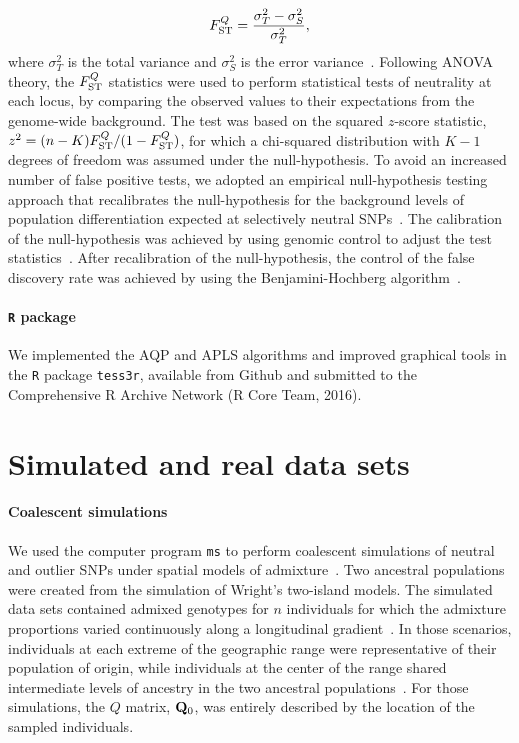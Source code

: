 $$
F^Q _{\rm ST}  =  \frac{\sigma^2_T - \sigma^2_S}{\sigma^2_T },
$$
where $\sigma^2_T$ is the total variance and $\sigma^2_S$ is the error
variance~\citep{weir1996}. Following ANOVA theory, the $F^Q_{\rm ST}$ statistics
were used to perform statistical tests of neutrality at each locus, by comparing
the observed values to their expectations from the genome-wide background. The
test was based on the squared $z$-score statistic, $z^2 = (n-K) F^{Q}_{\rm
  ST}/(1 - F^{Q}_{\rm ST})$, for which a chi-squared distribution with $K-1$
degrees of freedom was assumed under the null-hypothesis. To avoid an increased
number of false positive tests, we adopted an empirical null-hypothesis testing
approach that recalibrates the null-hypothesis for the background levels of
population differentiation expected at selectively neutral SNPs~\citep{efron2004}.
The calibration of the null-hypothesis was achieved by using genomic control to
adjust the test statistics~\citep{Devlin1999, Francois2016}. After recalibration
of the null-hypothesis, the control of the false discovery rate was achieved by
using the Benjamini-Hochberg algorithm~\citep{Benjamini1995}.


\paragraph{{\tt R} package} We implemented the AQP and APLS algorithms and
improved graphical tools in the {\tt R} package {\tt tess3r}, available from
Github and submitted to the Comprehensive R Archive Network (R Core Team, 2016).


\section{Simulated and real data sets}
\paragraph{Coalescent simulations} We used the computer program {\tt ms} to
perform coalescent simulations of neutral and outlier SNPs under spatial models
of admixture~\citep{Hudson2002}. Two ancestral populations were created from the
simulation of Wright\rq{}s two-island models. The simulated data sets contained
admixed genotypes for $n$ individuals for which the admixture proportions varied
continuously along a longitudinal gradient~\citep{Durand2009, Francois2010}. In
those scenarios, individuals at each extreme of the geographic range were
representative of their population of origin, while individuals at the center of
the range shared intermediate levels of ancestry in the two ancestral
populations~\citep{Caye2016}. For those simulations, the $Q$ matrix, ${\bf
  Q}_0$, was entirely described by the location of the sampled individuals.


